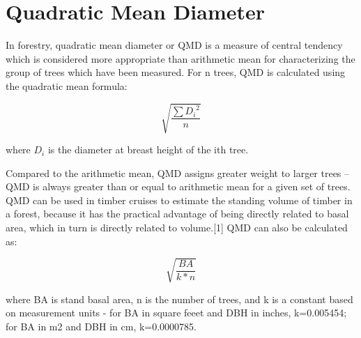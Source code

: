 \section{Quadratic Mean Diameter}

In forestry, quadratic mean diameter or QMD is a measure of central tendency which is considered more appropriate than 
arithmetic mean for characterizing the group of trees which have been measured. 
For n trees, QMD is calculated using the quadratic mean formula:

\[ {\displaystyle {\sqrt {\frac {\sum {D_{i}}^{2}}{n}}}}\]

where ${\displaystyle {D_{i}}}$ is the diameter at breast height of the ith tree. 

Compared to the arithmetic mean, QMD assigns greater weight to larger trees – QMD is always greater than or equal to 
arithmetic mean for a given set of trees. QMD can be used in timber cruises to estimate the standing volume of timber 
in a forest, because it has the practical advantage of being directly related to basal area, which in turn is directly
related to volume.[1] QMD can also be calculated as:

\[ {\displaystyle {\sqrt {\frac {BA}{k*n}}}}\]

where BA is stand basal area, n is the number of trees, and k is a constant based on measurement units - for BA in square feeet and
DBH in inches, k=0.005454; for BA in m2 and DBH in cm, k=0.0000785. 


